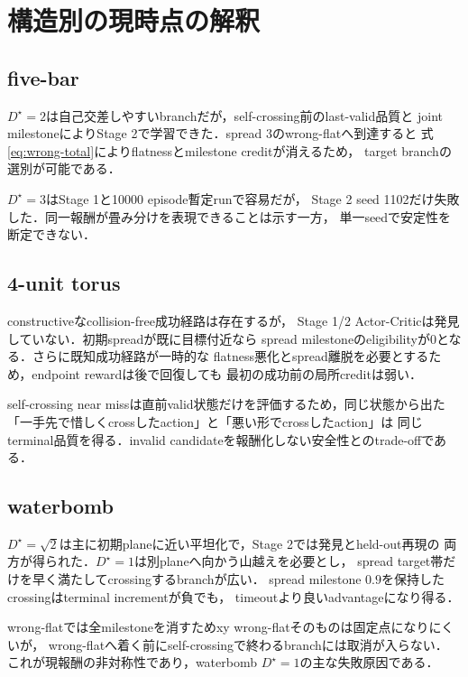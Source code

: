 \documentclass[a4paper,11pt]{ltjsarticle}
\begin{document}
\section{構造別の現時点の解釈}
\label{sec:interpretation}

\subsection{five-bar}

$D^\star=2$は自己交差しやすいbranchだが，self-crossing前のlast-valid品質と
joint milestoneによりStage 2で学習できた．spread 3のwrong-flatへ到達すると
式\eqref{eq:wrong-total}によりflatnessとmilestone creditが消えるため，
target branchの選別が可能である．

$D^\star=3$はStage 1と10000 episode暫定runで容易だが，
Stage 2 seed 1102だけ失敗した．同一報酬が畳み分けを表現できることは示す一方，
単一seedで安定性を断定できない．

\subsection{4-unit torus}

constructiveなcollision-free成功経路は存在するが，
Stage 1/2 Actor-Criticは発見していない．初期spreadが既に目標付近なら
spread milestoneのeligibilityが0となる．さらに既知成功経路が一時的な
flatness悪化とspread離脱を必要とするため，endpoint rewardは後で回復しても
最初の成功前の局所creditは弱い．

self-crossing near missは直前valid状態だけを評価するため，同じ状態から出た
「一手先で惜しくcrossしたaction」と「悪い形でcrossしたaction」は
同じterminal品質を得る．invalid candidateを報酬化しない安全性とのtrade-offである．

\subsection{waterbomb}

$D^\star=\sqrt2$は主に初期planeに近い平坦化で，Stage 2では発見とheld-out再現の
両方が得られた．$D^\star=1$は別planeへ向かう山越えを必要とし，
spread target帯だけを早く満たしてcrossingするbranchが広い．
spread milestone $0.9$を保持したcrossingはterminal incrementが負でも，
timeoutより良いadvantageになり得る．

wrong-flatでは全milestoneを消すためxy wrong-flatそのものは固定点になりにくいが，
wrong-flatへ着く前にself-crossingで終わるbranchには取消が入らない．
これが現報酬の非対称性であり，waterbomb $D^\star=1$の主な失敗原因である．
\end{document}
